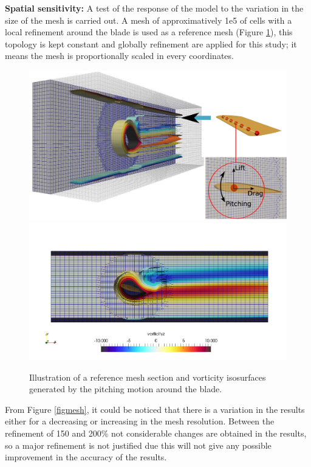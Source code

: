 \documentclass[a4paper]{jpconf}
\begin{document}
\textbf{Spatial sensitivity:} A test of the response of the model 
to the variation in the size of the mesh is carried out. A mesh of approximatively 1e5 of cells with a local refinement around the blade is used as a reference mesh (Figure \ref{figrefmesh}), this topology is kept constant and globally refinement are applied for this study; it means the mesh is proportionally scaled in every coordinates. 

\begin{figure}[h]
\begin{minipage}{36pc}
\includegraphics[width=0.5\columnwidth]{vorticityZ2.eps}
\includegraphics[width=0.5\columnwidth]{vorticityZ.png}
\end{minipage}%
\caption{\label{figrefmesh} Illustration of a reference mesh section and vorticity isosurfaces generated by the pitching motion around the blade.}
\end{figure}

From Figure \ref{figmesh}, it could be noticed that there is a  variation in the results either for a decreasing or increasing in the mesh resolution. Between the refinement of 150 and 200\% not considerable changes are obtained in the results, so a major refinement is not justified due this will not give any possible improvement in the accuracy of the results. 
\end{document}
